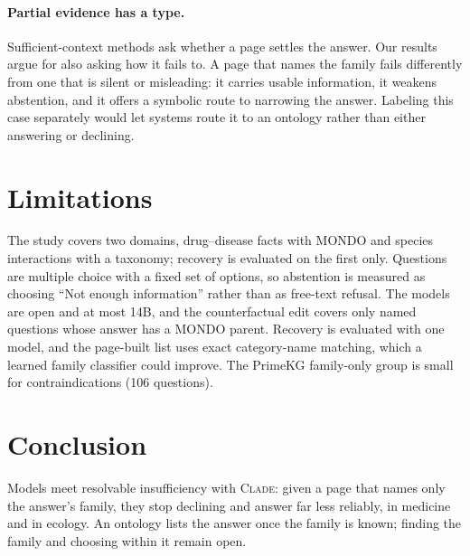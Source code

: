 \documentclass[letterpaper]{article} %
\newcommand{\clade}{\textsc{Clade}}
\begin{document}
\paragraph{Partial evidence has a type.}
Sufficient-context methods ask whether a page settles the answer. Our results
argue for also asking how it fails to. A page that names the family fails
differently from one that is silent or misleading: it carries usable
information, it weakens abstention, and it offers a symbolic route to
narrowing the answer. Labeling
this case separately would let systems route it to an ontology rather than
either answering or declining.

\section{Limitations}

The study covers two domains, drug--disease facts with MONDO and species
interactions with a taxonomy; recovery is evaluated on the first only. Questions are
multiple choice with a fixed set of options, so abstention is measured as
choosing ``Not enough information'' rather than as free-text refusal. The models are open and at most 14B, and the
counterfactual edit covers only named questions whose answer has a MONDO parent.
Recovery is evaluated with one model, and
the page-built list uses exact category-name matching, which a learned family
classifier could improve. The PrimeKG family-only group is small for
contraindications (106 questions).

\section{Conclusion}

Models meet resolvable insufficiency with \clade{}: given a page that names only
the answer's family, they stop declining and answer far less reliably, in
medicine and in ecology. An ontology lists the answer once the family is known;
finding the family and choosing within it remain open.


\end{document}
